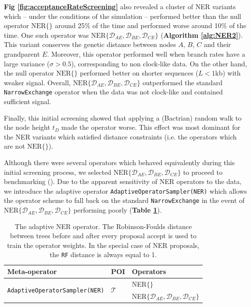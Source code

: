 \documentclass[10pt,letterpaper]{article}
\begin{document}
\textbf{Fig \ref{fig:acceptanceRateScreening}} also revealed a cluster of NER variants which -- under the conditions of the simulation --  performed better than the null operator $\text{NER}\{\}$ around 25\% of the time and performed worse around 10\% of the time. 
One such operator was  $\text{NER}\{\mathcal{D}_{AE}, \mathcal{D}_{BE}, \mathcal{D}_{CE}\}$  (\textbf{Algorithm \ref{alg:NER2}}). 
This variant conserves the genetic distance between nodes $A$, $B$, $C$ and their grandparent $E$. 
Moreover, this operator performed well when branch rates have a large variance ($\sigma > 0.5$), corresponding to non clock-like data. 
On the other hand, the null operator $\text{NER}\{\}$ performed better on shorter sequences ($L < 1$kb) with weaker signal.  
Overall, $\text{NER}\{\mathcal{D}_{AE}, \mathcal{D}_{BE}, \mathcal{D}_{CE}\}$ outperformed the standard \texttt{NarrowExchange} operator when the data was not clock-like and contained sufficient signal. 



Finally, this initial screening showed that applying a (Bactrian) random walk to the node height $t_D$ made the operator worse.
This effect was most dominant for the NER variants which satisfied distance constraints (i.e. the operators which are not $\text{NER}\{\}$).




Although there were several operators which behaved equivalently during this initial screening process, we selected $\text{NER}\{\mathcal{D}_{AE}, \mathcal{D}_{BE}, \mathcal{D}_{CE}\}$ to proceed to benchmarking (\textbf{}).
Due to the apparent sensitivity of NER operators to the data, we introduce the adaptive operator \texttt{AdaptiveOperatorSampler(NER)} which allows the operator scheme to fall back on the standard \texttt{NarrowExchange} in the event of $\text{NER}\{\mathcal{D}_{AE}, \mathcal{D}_{BE}, \mathcal{D}_{CE}\}$ performing poorly (\textbf{Table \ref{table:adaptiveNER}}).





\begin{table}[h!]
\centering
\begin{tabular}{l l l} 
 Meta-operator & POI & Operators \\
\hline
 \multirow{2}{*}{\texttt{AdaptiveOperatorSampler(NER)}} & \multirow{2}{*}{$\mathcal{T}$} & NER$\{  \}$ \\ 
 && NER$\{ \mathcal{D}_{AE}, \mathcal{D}_{BE}, \mathcal{D}_{CE} \}$ \\
\end{tabular}
\caption{The adaptive NER operator. 
The Robinson-Foulds distance between trees before and after every proposal accept is used to train the operator weights. In the special case of NER proposals, the \texttt{RF} distance is always equal to 1. }
\label{table:adaptiveNER}
\end{table}
\end{document}
